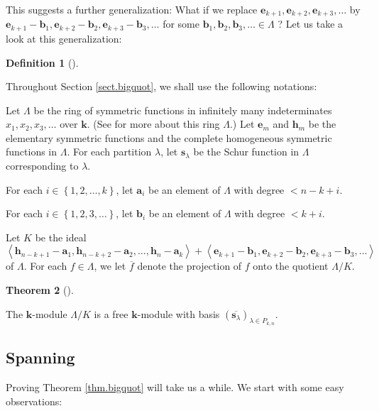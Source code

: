 \documentclass[numbers=enddot,12pt,final,onecolumn,notitlepage]{scrartcl}%
\theoremstyle{definition}
\newtheorem{theo}{Theorem}[section]
\newenvironment{theorem}[1][]
{\begin{theo}[#1]\begin{leftbar}}
{\end{leftbar}\end{theo}}
\newtheorem{defi}[theo]{Definition}
\newenvironment{definition}[1][]
{\begin{defi}[#1]\begin{leftbar}}
{\end{leftbar}\end{defi}}
\begin{document}
This suggests a further generalization: What if we replace $\mathbf{e}%
_{k+1},\mathbf{e}_{k+2},\mathbf{e}_{k+3},\ldots$ by $\mathbf{e}_{k+1}%
-\mathbf{b}_{1},\mathbf{e}_{k+2}-\mathbf{b}_{2},\mathbf{e}_{k+3}%
-\mathbf{b}_{3},\ldots$ for some $\mathbf{b}_{1},\mathbf{b}_{2},\mathbf{b}%
_{3},\ldots\in\Lambda$ ? Let us take a look at this generalization:

\begin{definition}
\label{def.bigquot.setup}Throughout Section \ref{sect.bigquot}, we shall use
the following notations:

Let $\Lambda$ be the ring of symmetric functions in infinitely many
indeterminates $x_{1},x_{2},x_{3},\ldots$ over $\mathbf{k}$. (See
\cite[Chapter 2]{GriRei18} for more about this ring $\Lambda$.) Let
$\mathbf{e}_{m}$ and $\mathbf{h}_{m}$ be the elementary symmetric functions
and the complete homogeneous symmetric functions in $\Lambda$. For each
partition $\lambda$, let $\mathbf{s}_{\lambda}$ be the Schur function in
$\Lambda$ corresponding to $\lambda$.

For each $i\in\left\{  1,2,\ldots,k\right\}  $, let $\mathbf{a}_{i}$ be an
element of $\Lambda$ with degree $<n-k+i$.

For each $i\in\left\{  1,2,3,\ldots\right\}  $, let $\mathbf{b}_{i}$ be an
element of $\Lambda$ with degree $<k+i$.

Let $K$ be the ideal%
\[
\left\langle \mathbf{h}_{n-k+1}-\mathbf{a}_{1},\mathbf{h}_{n-k+2}%
-\mathbf{a}_{2},\ldots,\mathbf{h}_{n}-\mathbf{a}_{k}\right\rangle
+\left\langle \mathbf{e}_{k+1}-\mathbf{b}_{1},\mathbf{e}_{k+2}-\mathbf{b}%
_{2},\mathbf{e}_{k+3}-\mathbf{b}_{3},\ldots\right\rangle
\]
of $\Lambda$. For each $f\in\Lambda$, we let $\overline{f}$ denote the
projection of $f$ onto the quotient $\Lambda/K$.
\end{definition}

\begin{theorem}
\label{thm.bigquot}The $\mathbf{k}$-module $\Lambda/K$ is a free $\mathbf{k}%
$-module with basis $\left(  \overline{\mathbf{s}_{\lambda}}\right)
_{\lambda\in P_{k,n}}$.
\end{theorem}

\subsection{Spanning}

Proving Theorem \ref{thm.bigquot} will take us a while. We start with some
easy observations:
\end{document}
